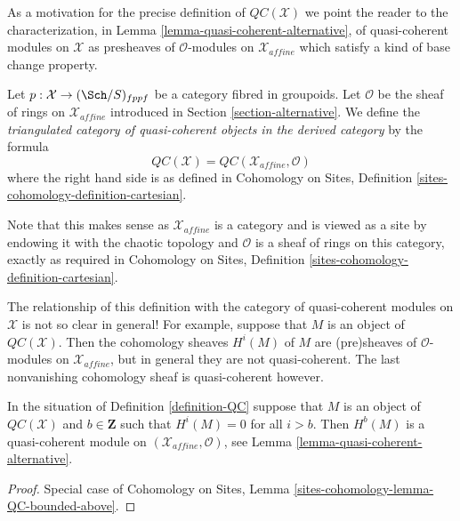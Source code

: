 \medskip\noindent
As a motivation for the precise definition of $\mathit{QC}(\mathcal{X})$
we point the reader to the characterization, in
Lemma \ref{lemma-quasi-coherent-alternative},
of quasi-coherent modules on $\mathcal{X}$ as presheaves of
$\mathcal{O}$-modules on $\mathcal{X}_{affine}$ which
satisfy a kind of base change property.

\begin{definition}
\label{definition-QC}
Let $p : \mathcal{X} \to (\Sch/S)_{fppf}$ be a category fibred in groupoids.
Let $\mathcal{O}$ be the sheaf of rings on $\mathcal{X}_{affine}$ introduced
in Section \ref{section-alternative}. We define the
{\it triangulated category of quasi-coherent objects in the derived category}
by the formula
$$
\mathit{QC}(\mathcal{X}) = \mathit{QC}(\mathcal{X}_{affine}, \mathcal{O})
$$
where the right hand side is as defined in
Cohomology on Sites, Definition \ref{sites-cohomology-definition-cartesian}.
\end{definition}

\noindent
Note that this makes sense as $\mathcal{X}_{affine}$ is a category and
is viewed as a site by endowing it with the chaotic topology and
$\mathcal{O}$ is a sheaf of rings on this category, exactly as required in 
Cohomology on Sites, Definition \ref{sites-cohomology-definition-cartesian}.

\medskip\noindent
The relationship of this definition with the category of quasi-coherent
modules on $\mathcal{X}$ is not so clear in general! For example, suppose
that $M$ is an object of $\mathit{QC}(\mathcal{X})$. Then the cohomology
sheaves $H^i(M)$ of $M$ are (pre)sheaves of $\mathcal{O}$-modules on
$\mathcal{X}_{affine}$, but in general they are not quasi-coherent. The last
nonvanishing cohomology sheaf is quasi-coherent however.

\begin{lemma}
\label{lemma-QC-bounded-above}
In the situation of Definition \ref{definition-QC} suppose that
$M$ is an object of $\mathit{QC}(\mathcal{X})$ and $b \in \mathbf{Z}$
such that $H^i(M) = 0$ for all $i > b$.
Then $H^b(M)$ is a quasi-coherent module on
$(\mathcal{X}_{affine}, \mathcal{O})$, see
Lemma \ref{lemma-quasi-coherent-alternative}.
\end{lemma}

\begin{proof}
Special case of
Cohomology on Sites, Lemma \ref{sites-cohomology-lemma-QC-bounded-above}.
\end{proof}


